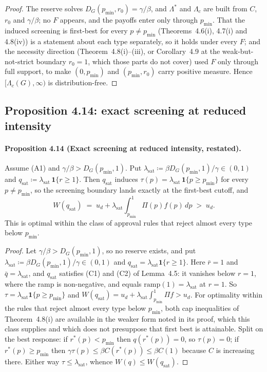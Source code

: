 \documentclass[acmsmall,nonacm,screen]{acmart}
\theoremstyle{acmplain}%
\theoremstyle{acmdefinition}%
\numberwithin{equation}{section}
\begin{document}
\begin{appendix}
\begin{proof}
The reserve solves $D_G(p_{\min},r_0)=\gamma/\beta$, and $\Lambda^*$ and $\Lambda_c$ are built from $C$, $r_0$ and $\gamma/\beta$; no $F$ appears, and the payoffs enter only through $p_{\min}$. That the induced screening is first-best for every $p\neq p_{\min}$ (Theorems~4.6(i), 4.7(i) and 4.8(iv)) is a statement about each type separately, so it holds under every $F$; and the necessity direction (Theorem~4.8(i)--(iii), or Corollary~4.9 at the weak-but-not-strict boundary $r_0=1$, which those parts do not cover) used $F$ only through full support, to make $(0,p_{\min})$ and $(p_{\min},r_0)$ carry positive measure. Hence $[\Lambda_c(G),\infty)$ is distribution-free.
\end{proof}


\subsection{Proposition 4.14: exact screening at reduced intensity}

\paragraph*{Proposition 4.14 (Exact screening at reduced intensity, restated).}
Assume (A1) and $\gamma/\beta > D_G(p_{\min},1)$. Put $\lambda_{\mathrm{sat}} \coloneqq \beta D_G(p_{\min},1)/\gamma \in (0,1)$ and $q_{\mathrm{sat}} \coloneqq \lambda_{\mathrm{sat}}\,\mathbf 1\{r \ge 1\}$. Then $q_{\mathrm{sat}}$ induces $\tau(p) = \lambda_{\mathrm{sat}}\,\mathbf 1\{p \ge p_{\min}\}$ for every $p \ne p_{\min}$, so the screening boundary lands exactly at the first-best cutoff, and
\[
W(q_{\mathrm{sat}}) \;=\; u_d + \lambda_{\mathrm{sat}}\int_{p_{\min}}^1 \Pi(p) f(p)\, dp \;>\; u_d .
\]
This is optimal within the class of approval rules that reject almost every type below $p_{\min}$.

\begin{proof}
Let $\gamma/\beta>D_G(p_{\min},1)$, so no reserve exists, and put $\lambda_{\mathrm{sat}}\coloneqq\beta D_G(p_{\min},1)/\gamma\in(0,1)$ and $q_{\mathrm{sat}}=\lambda_{\mathrm{sat}}\mathbf 1\{r\geq1\}$. Here $\bar r=1$ and $\bar q=\lambda_{\mathrm{sat}}$, and $q_{\mathrm{sat}}$ satisfies (C1) and (C2) of Lemma~4.5: it vanishes below $r=1$, where the ramp is non-negative, and equals $\mathrm{ramp}(1)=\lambda_{\mathrm{sat}}$ at $r=1$. So $\tau=\lambda_{\mathrm{sat}}\mathbf 1\{p\geq p_{\min}\}$ and $W(q_{\mathrm{sat}})=u_d+\lambda_{\mathrm{sat}}\int_{p_{\min}}^1\Pi f>u_d$. For optimality within the rules that reject almost every type below $p_{\min}$, both cap inequalities of Theorem~4.8(i) are available in the weaker form noted in its proof, which this class supplies and which does not presuppose that first best is attainable. Split on the best response: if $r^*(p)<p_{\min}$ then $q(r^*(p))=0$, so $\tau(p)=0$; if $r^*(p)\geq p_{\min}$ then $\gamma\tau(p)\leq\beta C(r^*(p))\leq\beta C(1)$ because $C$ is increasing there. Either way $\tau\leq\lambda_{\mathrm{sat}}$, whence $W(q)\leq W(q_{\mathrm{sat}})$.
\end{proof}



\end{appendix}
\end{document}
